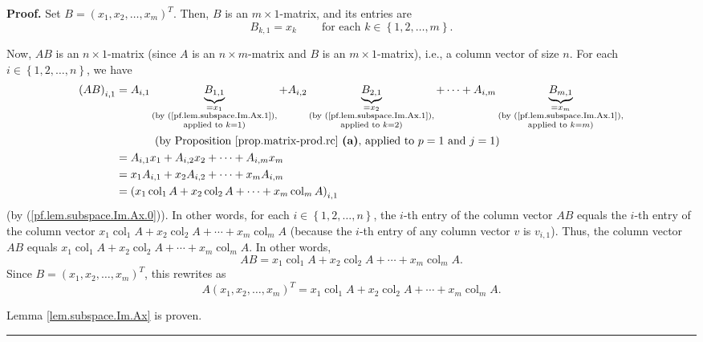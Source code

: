 \documentclass[numbers=enddot,12pt,final,onecolumn,notitlepage]{scrartcl}%
\theoremstyle{definition}
\newenvironment{proof}[1][Proof]{\noindent\textbf{#1.} }{\ \rule{0.5em}{0.5em}}
\begin{document}
\begin{proof}
Set $B=\left(  x_{1},x_{2},\ldots,x_{m}\right)  ^{T}$. Then, $B$ is an
$m\times1$-matrix, and its entries are%
\begin{equation}
B_{k,1}=x_{k}\ \ \ \ \ \ \ \ \ \ \text{for each }k\in\left\{  1,2,\ldots
,m\right\}  . \label{pf.lem.subspace.Im.Ax.1}%
\end{equation}


Now, $AB$ is an $n\times1$-matrix (since $A$ is an $n\times m$-matrix and $B$
is an $m\times1$-matrix), i.e., a column vector of size $n$. For each
$i\in\left\{  1,2,\ldots,n\right\}  $, we have%
\begin{align*}
\left(  AB\right)  _{i,1}  &  =A_{i,1}\underbrace{B_{1,1}}_{\substack{=x_{1}%
\\\text{(by (\ref{pf.lem.subspace.Im.Ax.1}),}\\\text{applied to }k=1\text{)}%
}}+A_{i,2}\underbrace{B_{2,1}}_{\substack{=x_{2}\\\text{(by
(\ref{pf.lem.subspace.Im.Ax.1}),}\\\text{applied to }k=2\text{)}}%
}+\cdots+A_{i,m}\underbrace{B_{m,1}}_{\substack{=x_{m}\\\text{(by
(\ref{pf.lem.subspace.Im.Ax.1}),}\\\text{applied to }k=m\text{)}}}\\
&  \ \ \ \ \ \ \ \ \ \ \left(  \text{by Proposition \ref{prop.matrix-prod.rc}
\textbf{(a)}, applied to }p=1\text{ and }j=1\right) \\
&  =A_{i,1}x_{1}+A_{i,2}x_{2}+\cdots+A_{i,m}x_{m}\\
&  =x_{1}A_{i,1}+x_{2}A_{i,2}+\cdots+x_{m}A_{i,m}\\
&  =\left(  x_{1}\operatorname*{col}\nolimits_{1}A+x_{2}\operatorname*{col}%
\nolimits_{2}A+\cdots+x_{m}\operatorname*{col}\nolimits_{m}A\right)  _{i,1}%
\end{align*}
(by (\ref{pf.lem.subspace.Im.Ax.0})). In other words, for each $i\in\left\{
1,2,\ldots,n\right\}  $, the $i$-th entry of the column vector $AB$ equals the
$i$-th entry of the column vector $x_{1}\operatorname*{col}\nolimits_{1}%
A+x_{2}\operatorname*{col}\nolimits_{2}A+\cdots+x_{m}\operatorname*{col}%
\nolimits_{m}A$ (because the $i$-th entry of any column vector $v$ is
$v_{i,1}$). Thus, the column vector $AB$ equals $x_{1}\operatorname*{col}%
\nolimits_{1}A+x_{2}\operatorname*{col}\nolimits_{2}A+\cdots+x_{m}%
\operatorname*{col}\nolimits_{m}A$. In other words,%
\[
AB=x_{1}\operatorname*{col}\nolimits_{1}A+x_{2}\operatorname*{col}%
\nolimits_{2}A+\cdots+x_{m}\operatorname*{col}\nolimits_{m}A.
\]
Since $B=\left(  x_{1},x_{2},\ldots,x_{m}\right)  ^{T}$, this rewrites as%
\[
A\left(  x_{1},x_{2},\ldots,x_{m}\right)  ^{T}=x_{1}\operatorname*{col}%
\nolimits_{1}A+x_{2}\operatorname*{col}\nolimits_{2}A+\cdots+x_{m}%
\operatorname*{col}\nolimits_{m}A.
\]


Lemma \ref{lem.subspace.Im.Ax} is proven.
\end{proof}
\end{document}
